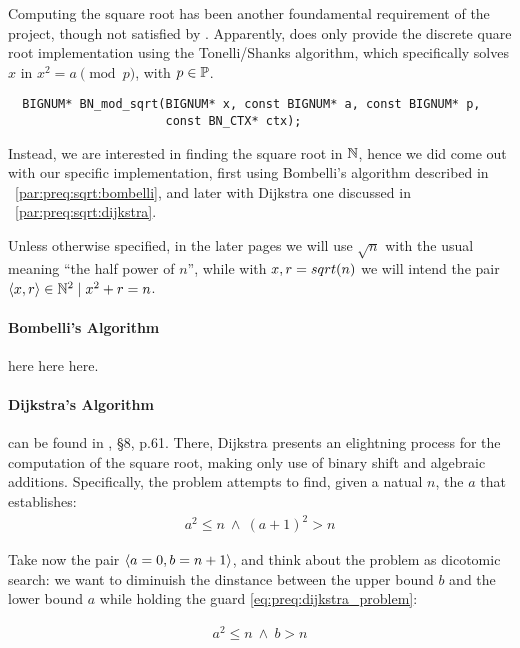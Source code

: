Computing the square root has been another foundamental requirement of the
project, though not satisfied by \openssl. Apparently,
\openssl does only provide the discrete quare root implementation using the
Tonelli/Shanks algorithm, which specifically solves $x$ in $x^2 = a \pmod{p}$,
with $p \in \mathbb{P}$.

\begin{verbatim}
  BIGNUM* BN_mod_sqrt(BIGNUM* x, const BIGNUM* a, const BIGNUM* p,
                      const BN_CTX* ctx);
\end{verbatim}

Instead, we are interested in finding the square root in $\mathbb{N}$, hence we
did come out with our specific implementation, first using Bombelli's algorithm
described in ~\ref{par:preq:sqrt:bombelli},
and later with Dijkstra one discussed in ~\ref{par:preq:sqrt:dijkstra}.

Unless otherwise specified, in the later pages we will use $\sqrt{n}$ with the
usual meaning ``the half power of $n$'', while with $x, r = sqrt(n)$ we will
intend the pair $\langle x, r\rangle \in \mathbb{N}^2 \mid x^2 + r = n$.

\paragraph{Bombelli's Algorithm \label{par:preq:sqrt:bombelli}} here here here.

\paragraph{Dijkstra's Algorithm \label{par:preq:sqrt:dijkstra}} can be found in
\cite{Dijkstra:adop}, \S 8, p.61. There, Dijkstra presents an elightning
process for the computation of the square root, making only use of binary shift
and algebraic additions.
Specifically, the problem attempts to find, given a natual $n$, the $a$ that
establishes:
\begin{align}
  \label{eq:preq:dijkstra_problem}
  a^2 \leq n \: \land \: (a+1)^2 > n
\end{align}

Take now the pair $\langle a=0, b=n+1\rangle$, and think about the problem as dicotomic
search: we want to diminuish the dinstance between the upper bound $b$ and the
lower bound $a$ while holding the guard \ref{eq:preq:dijkstra_problem}:

\begin{align*}
  a^2 \leq n \: \land \: b > n
\end{align*}

